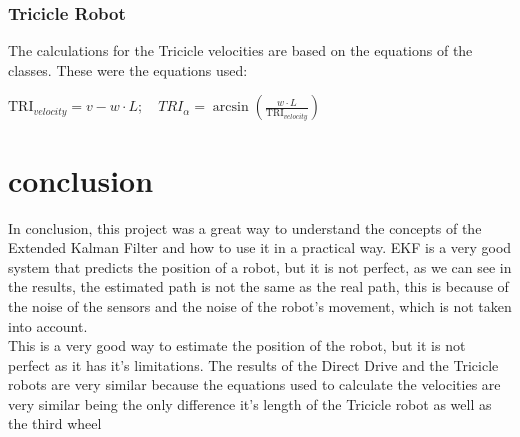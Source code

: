 \documentclass[runningheads]{llncs}
\begin{document}
\subsubsection*{Tricicle Robot}
The calculations for the Tricicle velocities are based on the equations of the classes. These were the equations used:

\begin{center}
    
\begin{math}
    \text{TRI}_{velocity} = v - w \cdot L ;\quad
    TRI_{\alpha} = \arcsin(\frac{w \cdot L}{  \text{TRI}_{velocity}})
\end{math}
\end{center}


\section{conclusion}


In conclusion, this project was a great way to understand the concepts of the
Extended Kalman Filter and how to use it in a practical way. EKF is a very good system that predicts the position of a robot, but it is not perfect, as we can
see in the results, the estimated path is not the same as the real path, this is
because of the noise of the sensors and the noise of the robot’s movement, which
is not taken into account.
\\ This is a very good way to estimate the
position of the robot, but it is not perfect as it has it's limitations.
The results of the Direct Drive and the Tricicle robots are very similar because the equations used to calculate the velocities are very similar being the only difference it's length of the Tricicle robot as well as the third wheel
\end{document}
